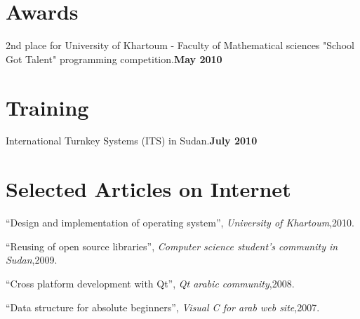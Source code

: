 \documentclass[margin,line]{resume}
\begin{document}
\begin{resume}
    \section{\mysidestyle  Awards} 

2nd place for University of Khartoum - Faculty of Mathematical sciences "School Got Talent" programming competition.\hfill \textbf{May 2010}\vspace{-3mm}\\\vspace{-1mm}%

    \section{\mysidestyle  Training} 

International Turnkey Systems (ITS) in Sudan.\hfill \textbf{July 2010}\vspace{-3mm}\\\vspace{-1mm}%


    \section{\mysidestyle Selected Articles on Internet }
   ``Design and implementation of operating system'',
    \textsl{University of Khartoum},2010.

\vspace{-2mm}
   ``Reusing of open source libraries'',
    \textsl{Computer science student's community in Sudan},2009.

\vspace{-2mm}
   ``Cross platform development with Qt'',
    \textsl{Qt arabic community},2008.

\vspace{-2mm}
   ``Data structure for absolute beginners'',
    \textsl{Visual C for arab web site},2007.

\vspace{-2mm}



\end{resume}
\end{document}
